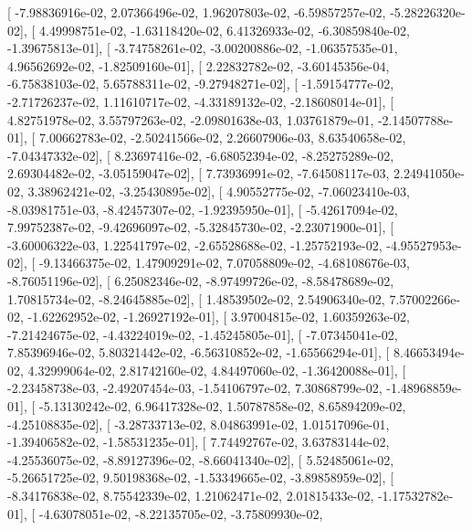 \documentclass{article}
\begin{document}
       [ -7.98836916e-02,   2.07366496e-02,   1.96207803e-02,
         -6.59857257e-02,  -5.28226320e-02],
       [  4.49998751e-02,  -1.63118420e-02,   6.41326933e-02,
         -6.30859840e-02,  -1.39675813e-01],
       [ -3.74758261e-02,  -3.00200886e-02,  -1.06357535e-01,
          4.96562692e-02,  -1.82509160e-01],
       [  2.22832782e-02,  -3.60145356e-04,  -6.75838103e-02,
          5.65788311e-02,  -9.27948271e-02],
       [ -1.59154777e-02,  -2.71726237e-02,   1.11610717e-02,
         -4.33189132e-02,  -2.18608014e-01],
       [  4.82751978e-02,   3.55797263e-02,  -2.09801638e-03,
          1.03761879e-01,  -2.14507788e-01],
       [  7.00662783e-02,  -2.50241566e-02,   2.26607906e-03,
          8.63540658e-02,  -7.04347332e-02],
       [  8.23697416e-02,  -6.68052394e-02,  -8.25275289e-02,
          2.69304482e-02,  -3.05159047e-02],
       [  7.73936991e-02,  -7.64508117e-03,   2.24941050e-02,
          3.38962421e-02,  -3.25430895e-02],
       [  4.90552775e-02,  -7.06023410e-03,  -8.03981751e-03,
         -8.42457307e-02,  -1.92395950e-01],
       [ -5.42617094e-02,   7.99752387e-02,  -9.42696097e-02,
         -5.32845730e-02,  -2.23071900e-01],
       [ -3.60006322e-03,   1.22541797e-02,  -2.65528688e-02,
         -1.25752193e-02,  -4.95527953e-02],
       [ -9.13466375e-02,   1.47909291e-02,   7.07058809e-02,
         -4.68108676e-03,  -8.76051196e-02],
       [  6.25082346e-02,  -8.97499726e-02,  -8.58478689e-02,
          1.70815734e-02,  -8.24645885e-02],
       [  1.48539502e-02,   2.54906340e-02,   7.57002266e-02,
         -1.62262952e-02,  -1.26927192e-01],
       [  3.97004815e-02,   1.60359263e-02,  -7.21424675e-02,
         -4.43224019e-02,  -1.45245805e-01],
       [ -7.07345041e-02,   7.85396946e-02,   5.80321442e-02,
         -6.56310852e-02,  -1.65566294e-01],
       [  8.46653494e-02,   4.32999064e-02,   2.81742160e-02,
          4.84497060e-02,  -1.36420088e-01],
       [ -2.23458738e-03,  -2.49207454e-03,  -1.54106797e-02,
          7.30868799e-02,  -1.48968859e-01],
       [ -5.13130242e-02,   6.96417328e-02,   1.50787858e-02,
          8.65894209e-02,  -4.25108835e-02],
       [ -3.28733713e-02,   8.04863991e-02,   1.01517096e-01,
         -1.39406582e-02,  -1.58531235e-01],
       [  7.74492767e-02,   3.63783144e-02,  -4.25536075e-02,
         -8.89127396e-02,  -8.66041340e-02],
       [  5.52485061e-02,  -5.26651725e-02,   9.50198368e-02,
         -1.53349665e-02,  -3.89858959e-02],
       [ -8.34176838e-02,   8.75542339e-02,   1.21062471e-02,
          2.01815433e-02,  -1.17532782e-01],
       [ -4.63078051e-02,  -8.22135705e-02,  -3.75809930e-02,
\end{document}
